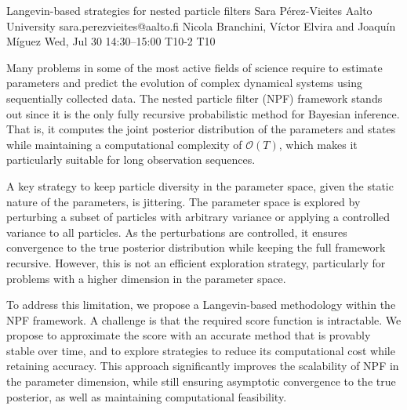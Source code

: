 \begin{talk}
  {Langevin-based strategies for nested particle filters}%
  {Sara Pérez-Vieites}%
  {Aalto University}%
  {sara.perezvieites@aalto.fi}%
  {Nicola Branchini, Víctor Elvira and Joaquín Míguez}%
  {}%
  {Wed, Jul 30 14:30–15:00}%
  {T10-2}%
  {T10}%
  
				
			
Many problems in some of the most active fields of science require to estimate parameters and predict the evolution of complex dynamical systems using sequentially collected data. The nested particle filter (NPF) framework stands out since it is the only fully recursive probabilistic method for Bayesian inference. That is, it computes the joint posterior distribution of the parameters and states while maintaining a computational complexity of $\mathcal{O}(T)$, which makes it particularly suitable for long observation sequences. 

A key strategy to keep particle diversity in the parameter space, given the static nature of the parameters, is jittering. The parameter space is explored by perturbing a subset of particles with arbitrary variance or applying a controlled variance to all particles. As the perturbations are controlled, it ensures convergence to the true posterior distribution while keeping the full framework recursive. However, this is not an efficient exploration strategy, particularly for problems with a higher dimension in the parameter space.

To address this limitation, we propose a Langevin-based methodology within the NPF framework. A challenge is that the required score function is intractable. We propose to approximate the score with an accurate method that is provably stable over time, and to explore strategies to reduce its computational cost while retaining accuracy.
This approach significantly improves the scalability of NPF in the parameter dimension, while still ensuring asymptotic convergence to the true posterior, as well as maintaining computational feasibility.

\medskip



\end{talk}

